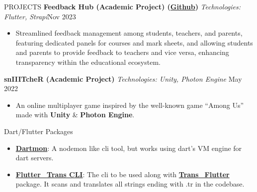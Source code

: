 \documentclass{resume}
\begin{document}
\begin{rSection}{PROJECTS}
    \textbf{Feedback Hub (Academic Project) (\href{https://github.com/ShivanshuKGupta/feedback_hub}{Github})} \textit{Technologies: Flutter, Strapi}\hfill Nov 2023
    \begin{itemize}
        \itemsep -3pt {}
        \item Streamlined feedback management among students, teachers, and parents, featuring dedicated panels for courses and mark sheets, and allowing students and parents to provide feedback to teachers and vice versa, enhancing transparency within the educational ecosystem.
    \end{itemize}

    \textbf{snIIITcheR (Academic Project)} \textit{Technologies: Unity, Photon Engine} \hfill May 2022
    \begin{itemize}
        \itemsep -3pt {}
        \item An online multiplayer game inspired by the well-known game “Among Us” made with \textbf{Unity} \& \textbf{Photon Engine}.
    \end{itemize}
\end{rSection}

\begin{rSection}{Dart/Flutter Packages}
    \begin{itemize}
        \item \textbf{\href{https://pub.dev/packages/dartmon_cli}{Dartmon}}: A nodemon like cli tool, but works using dart's VM engine for dart servers.

        \item \textbf{\href{https://pub.dev/packages/fluttertrans}{Flutter\_Trans CLI}}: The cli to be used along with \textbf{\href{https://pub.dev/packages/trans_flutter}{Trans\_Flutter}} package. It scans and translates all strings ending with .tr in the codebase.

    \end{itemize}
\end{rSection}

\end{document}
